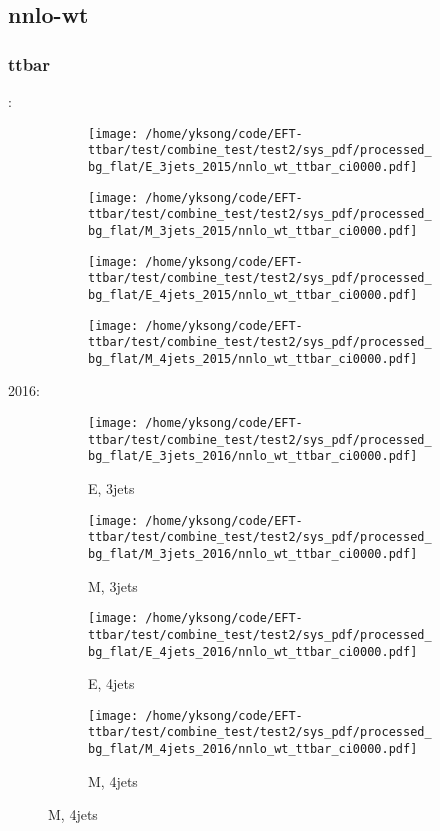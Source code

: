 \documentclass{beamer}
\begin{document}
\subsection{nnlo-wt}

\begin{frame}
\frametitle{ttbar}
\fontsize{5}{1}:
\begin{figure}
\centering
\begin{subfigure}[b]{0.24\textwidth}
\texttt{[image: /home/yksong/code/EFT-ttbar/test/combine\_test/test2/sys\_pdf/processed\_bg\_flat/E\_3jets\_2015/nnlo\_wt\_ttbar\_ci0000.pdf]}
\end{subfigure}
\begin{subfigure}[b]{0.24\textwidth}
\texttt{[image: /home/yksong/code/EFT-ttbar/test/combine\_test/test2/sys\_pdf/processed\_bg\_flat/M\_3jets\_2015/nnlo\_wt\_ttbar\_ci0000.pdf]}
\end{subfigure}
\begin{subfigure}[b]{0.24\textwidth}
\texttt{[image: /home/yksong/code/EFT-ttbar/test/combine\_test/test2/sys\_pdf/processed\_bg\_flat/E\_4jets\_2015/nnlo\_wt\_ttbar\_ci0000.pdf]}
\end{subfigure}
\begin{subfigure}[b]{0.24\textwidth}
\texttt{[image: /home/yksong/code/EFT-ttbar/test/combine\_test/test2/sys\_pdf/processed\_bg\_flat/M\_4jets\_2015/nnlo\_wt\_ttbar\_ci0000.pdf]}
\end{subfigure}
\end{figure}
2016:
\begin{figure}
\centering
\begin{subfigure}[b]{0.24\textwidth}
\texttt{[image: /home/yksong/code/EFT-ttbar/test/combine\_test/test2/sys\_pdf/processed\_bg\_flat/E\_3jets\_2016/nnlo\_wt\_ttbar\_ci0000.pdf]}
\captionsetup{font=tiny}
\caption{E, 3jets}
\end{subfigure}
\begin{subfigure}[b]{0.24\textwidth}
\texttt{[image: /home/yksong/code/EFT-ttbar/test/combine\_test/test2/sys\_pdf/processed\_bg\_flat/M\_3jets\_2016/nnlo\_wt\_ttbar\_ci0000.pdf]}
\captionsetup{font=tiny}
\caption{M, 3jets}
\end{subfigure}
\begin{subfigure}[b]{0.24\textwidth}
\texttt{[image: /home/yksong/code/EFT-ttbar/test/combine\_test/test2/sys\_pdf/processed\_bg\_flat/E\_4jets\_2016/nnlo\_wt\_ttbar\_ci0000.pdf]}
\captionsetup{font=tiny}
\caption{E, 4jets}
\end{subfigure}
\begin{subfigure}[b]{0.24\textwidth}
\texttt{[image: /home/yksong/code/EFT-ttbar/test/combine\_test/test2/sys\_pdf/processed\_bg\_flat/M\_4jets\_2016/nnlo\_wt\_ttbar\_ci0000.pdf]}
\captionsetup{font=tiny}
\caption{M, 4jets}
\end{subfigure}
\end{figure}
\end{frame}
\end{document}
